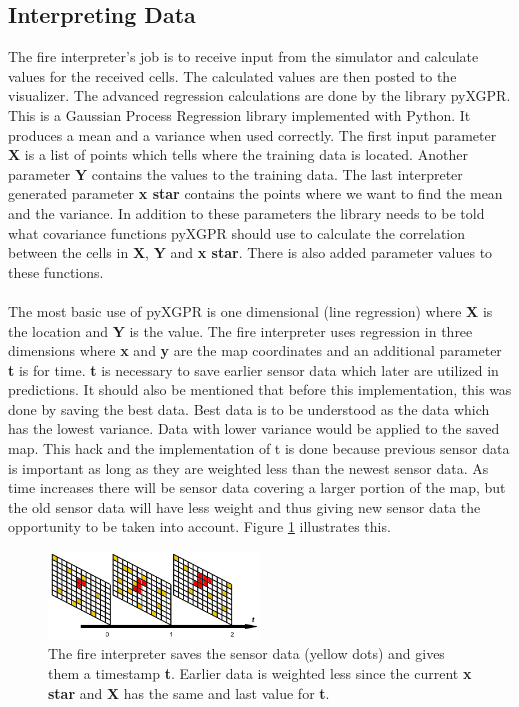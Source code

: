 \subsection{Interpreting Data}
The fire interpreter's job is to receive input from the simulator and 
calculate values for the received cells. The calculated values are then posted to the visualizer. The advanced regression calculations are done by the library pyXGPR. This is a Gaussian Process Regression library implemented with Python. It produces a mean and a variance when used correctly. The first input parameter \textbf{X} is a list of points which tells where the training data is located. Another parameter \textbf{Y} contains the values to the training data. The last interpreter generated parameter \textbf{x star} contains the points where we want to find the mean and the variance. In addition to these parameters the library needs to be told what covariance functions pyXGPR should use to calculate the correlation between the cells in \textbf{X}, \textbf{Y} and \textbf{x star}. There is also added parameter values to these functions.
\\\\
The most basic use of pyXGPR is one dimensional (line regression) where \textbf{X} is the location and \textbf{Y} is the value. The fire interpreter uses regression in three dimensions where \textbf{x} and \textbf{y} are the map coordinates and an additional parameter \textbf{t} is for time. \textbf{t} is necessary to save earlier sensor data which later are utilized in predictions. It should also be mentioned that before this implementation, this was done by saving the best data. Best data is to be understood as the data which has the lowest variance. Data with lower variance would be applied to the saved map. This hack and the implementation of t is done because previous sensor data is important as long as they are weighted less than the newest sensor data. As time increases there will be sensor data covering a larger portion of the map, but the old sensor data will have less weight and thus giving new sensor data the opportunity to be taken into account. Figure \ref{fig:timeElapse} illustrates this.
\begin{figure}[here]
  \centering
      \includegraphics[width=0.5\textwidth]{solution/graphics/timeElapse.png}
  \caption{The fire interpreter saves the sensor data (yellow dots) and gives them a timestamp \textbf{t}. Earlier data is weighted less since the current \textbf{x star} and \textbf{X} has the same and last value for \textbf{t}. }
  \label{fig:timeElapse}
\end{figure}
